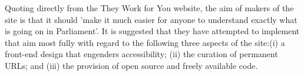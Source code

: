 Quoting directly from the They Work for You website, the aim of makers of the site is that it should 'make it much easier for anyone to understand exactly what is going on in Parliament'.
It is suggested that they have attempted to implement that aim most fully with regard to the following three aspects of the site:(i) a front-end design that engenders accessibility; (ii) the curation of permanent URLs; and (iii)
the provision of open source and freely available code.
